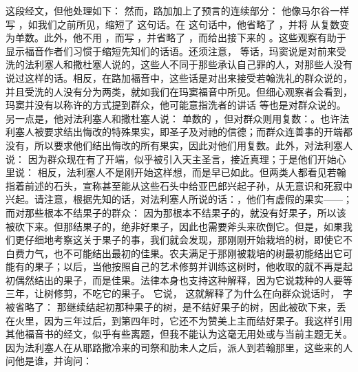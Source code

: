  这段经文，但他处理如下： 然而，路加加上了预言的连续部分： 他像马尔谷一样写 ，如我们之前所见，缩短了  这句话。在  这句话中，他省略了 ，并将  从复数变为单数。此外，他不用 ，而写 ，并省略了 ，而给出接下来的 。这些观察有助于显示福音作者们习惯于缩短先知们的话语。还须注意， 等话，玛窦说是对前来受洗的法利塞人和撒杜塞人说的，这些人不同于那些承认自己罪的人，对那些人没有说过这样的话。相反，在路加福音中，这些话是对出来接受若翰洗礼的群众说的，并且受洗的人没有分为两类，就如我们在玛窦福音中所见。但细心观察者会看到，玛窦并没有以称许的方式提到群众，他可能意指洗者的讲话  等也是对群众说的。另一点是，他对法利塞人和撒杜塞人说： 单数的 ，但对群众则用复数：。也许法利塞人被要求结出悔改的特殊果实，即圣子及对祂的信德；而群众连善事的开端都没有，所以要求他们结出悔改的所有果实，因此对他们用复数。此外，对法利塞人说： 因为群众现在有了开端，似乎被引入天主圣言，接近真理；于是他们开始心里说： 相反，法利塞人不是刚开始这样想，而是早已如此。但两类人都看见若翰指着前述的石头，宣称甚至能从这些石头中给亚巴郎兴起子孙，从无意识和死寂中兴起。请注意，根据先知的话，对法利塞人所说的话：，他们有虚假的果实——；而对那些根本不结果子的群众： 因为那根本不结果子的，就没有好果子，所以该被砍下来。但那结果子的，绝非好果子，因此也需要斧头来砍倒它。但是，如果我们更仔细地考察这关于果子的事，我们就会发现，那刚刚开始栽培的树，即使它不白费力气，也不可能结出最初的佳果。农夫满足于那刚被栽培的树最初能结出它可能有的果子；以后，当他按照自己的艺术修剪并训练这树时，他收取的就不再是起初偶然结出的果子，而是佳果。法律本身也支持这种解释，因为它说栽种的人要等三年，让树修剪，不吃它的果子。 它说， 这就解释了为什么在向群众说话时， 字被省略了： 那继续结起初那种果子的树，是不结好果子的树，因此被砍下来，丢在火里，因为三年过后，到第四年时，它还不为赞美上主而结好果子。我这样引用其他福音书的经文，似乎有些离题，但我不能认为这毫无用处或与当前主题无关。因为法利塞人在从耶路撒冷来的司祭和肋未人之后，派人到若翰那里，这些来的人问他是谁，并询问： 